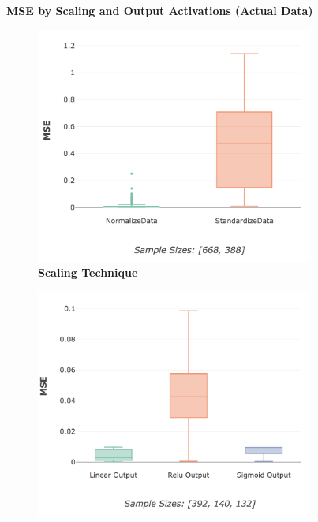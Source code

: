\documentclass[a4paper,11pt,oneside]{article}
\theoremstyle{plain}
\theoremstyle{definition}
\begin{document}
	\begin{figure}[H]
		\centering
		\textbf{MSE by Scaling and Output Activations (Actual Data)}
		\begin{subfigure}{.5\textwidth}
			\centering 
			\includegraphics[scale=0.32]{images/results/activations/actual_mse_scaling.png}
			\caption[MSE by Scaling and Output Activations (Actual Data) - Scaling Technique]{\textbf{Scaling Technique} 
				\newline }
			\label{figure-actual_mse_scaling}
		\end{subfigure}%
		\begin{subfigure}{.5\textwidth}
			\centering 
			\includegraphics[scale=0.32]{images/results/activations/actual_mse_output.png}

\end{subfigure}
\end{figure}
\end{document}
